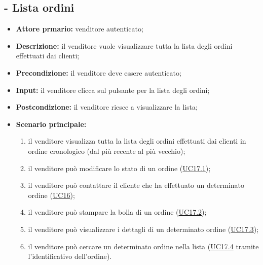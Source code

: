 \stepUserCase
\subsection{ - Lista ordini}
\begin{itemize}
    \item \textbf{Attore prmario:} venditore autenticato;
    \item \textbf{Descrizione:} il venditore vuole visualizzare tutta la lista degli ordini effettuati dai clienti;
    \item \textbf{Precondizione:} il venditore deve essere autenticato;
    \item \textbf{Input:} il venditore clicca sul pulsante per la lista degli ordini;
    \item \textbf{Postcondizione:} il venditore riesce a visualizzare la lista;
    \item \textbf{Scenario principale:}
          \begin{enumerate}
              \item il venditore visualizza tutta la lista degli ordini effettuati dai clienti in ordine cronologico (dal più recente al più vecchio);
              \item il venditore può modificare lo stato di un ordine (\hyperref[UC17.1]{UC17.1});
              \item il venditore può contattare il cliente che ha effettuato un determinato ordine (\hyperref[UC16]{UC16});
              \item il venditore può stampare la bolla di un ordine (\hyperref[UC17.2]{UC17.2});
              \item il venditore può visualizzare i dettagli di un determinato ordine (\hyperref[UC17.3]{UC17.3});
              \item il venditore può cercare un determinato ordine nella lista (\hyperref[UC17.4]{UC17.4} tramite l'identificativo dell'ordine).
            \end{enumerate}
\end{itemize}

\stepsubUserCase
